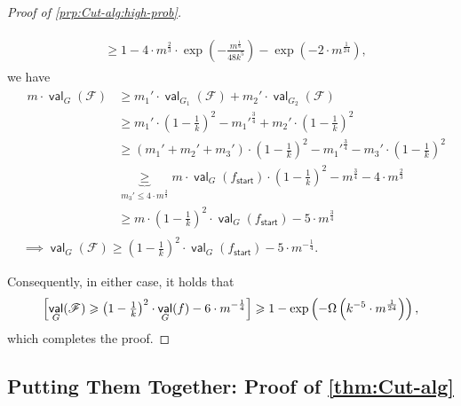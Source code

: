 \documentclass[11pt,fleqn]{article}
\renewcommand{\geq}{\geqslant}
\renewcommand{\leq}{\leqslant}
\DeclareMathOperator{\val}{\mathsf{val}}
\newcommand{\sss}{\mathsf{start}}
\newcommand{\f}{f}
\newcommand{\sqcol}{\scrF}
\newcommand{\scrF}{\mathscr{F}}
\let\Pr\relax\DeclareMathOperator*{\Pr}{\mathbb{P}}
\theoremstyle{definition}
\numberwithin{equation}{section}
\begin{document}
\begin{proof}[Proof of \cref{prp:Cut-alg:high-prob}]
\begin{description}
\begin{align}
\begin{aligned}
            & \geq 1
            - 4 \cdot m^{\frac{2}{3}} \cdot \exp\left(
                -\frac{m^\frac{1}{6}}{48 k^5}
            \right)
            - \exp\left(-2\cdot m^{\frac{1}{24}}\right),
        \end{aligned}
        \end{align}
        we have
        \begin{align}
        &
        \begin{aligned}
            m \cdot \val_G(\sqcol)
            & \geq m_1' \cdot \val_{G_1}(\sqcol) + m_2' \cdot \val_{G_2}(\sqcol) \\
            & \geq m_1' \cdot \left(1-\tfrac{1}{k}\right)^2 - m_1'^{\frac{3}{4}}
            + m_2' \cdot \left(1-\tfrac{1}{k}\right)^2 \\
            & \geq (m_1'+m_2'+m_3') \cdot \left(1-\tfrac{1}{k}\right)^2
                - m_1'^{\frac{3}{4}} - m_3' \cdot \left(1-\tfrac{1}{k}\right)^2 \\
            & \underbrace{\geq}_{m_3' \leq 4\cdot m^\frac{2}{3}}
                m \cdot \val_G(\f_\sss) \cdot \left(1-\tfrac{1}{k}\right)^2
                - m^\frac{3}{4} -
                4 \cdot m^\frac{2}{3} \\
            & \geq m \cdot \left(1-\tfrac{1}{k}\right)^2 \cdot \val_G(\f_\sss) - 5 \cdot m^\frac{3}{4}
        \end{aligned} \\
        & \implies \val_G(\sqcol)
            \geq \left(1-\tfrac{1}{k}\right)^2 \cdot \val_G(\f_\sss) - 5 \cdot m^{-\frac{1}{4}}.
        \end{align}
\end{description}
Consequently, in either case, it holds that
\begin{align}
    \Pr\Bigl[
        \val_G(\sqcol)
        \geq \left(1-\tfrac{1}{k}\right)^2 \cdot \val_G(\f) - 6 \cdot m^{-\frac{1}{4}}
    \Bigr]
    \geq 1 - \exp\left( - \Omega\left(k^{-5} \cdot m^{\frac{1}{24}}\right) \right),
\end{align}
which completes the proof.
\end{proof}

















\subsection{Putting Them Together: Proof of \texorpdfstring{\cref{thm:Cut-alg}}{Theorem~\protect\ref{thm:Cut-alg}}}
\end{document}
